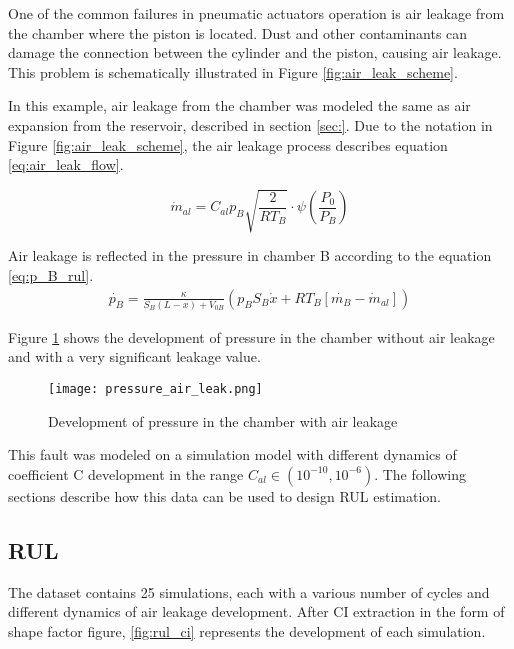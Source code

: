 One of the common failures in pneumatic actuators operation is air leakage
from the chamber where the piston is located. Dust and other contaminants
can damage the connection between the cylinder and the piston, causing air
leakage. This problem is schematically illustrated in Figure
\ref{fig:air_leak_scheme}.


In this example, air leakage from the chamber was modeled the same as air
expansion from the reservoir, described in section \ref{sec:}.  Due to the
notation in Figure \ref{fig:air_leak_scheme}, the air leakage process
describes equation \ref{eq:air_leak_flow}.

\begin{equation}
    \dot{m}_{al} = C_{al} p_B \sqrt{\frac{2}{R T_B}} \cdot
    \psi\left( \frac{P_0}{P_B} \right)
    \label{eq:air_leak_flow}
\end{equation}

Air leakage is reflected in the pressure in chamber B according to the
equation \ref{eq:p_B_rul}.
\begin{align}
    \dot{p_B} = \frac{\kappa}{S_B (L-x) + V_{0B}} \left(p_B S_B\dot{x} +
    RT_B[\dot{m_B}-\dot{m}_{al}] \right)
    \label{eq:p_B_rul}
\end{align}

Figure \ref{fig:pressure_air_leak} shows the development of pressure in the
chamber without air leakage and with a very significant leakage value.

\begin{figure}[h!]
    \centering
    \texttt{[image: pressure\_air\_leak.png]}
    \caption{Development of pressure in the chamber with air leakage}
    \label{fig:pressure_air_leak}
\end{figure}

This fault was modeled on a simulation model with different dynamics of
coefficient C development in the range $C_{al} \in (10^{-10}, 10^{-6})$. The following sections describe how
this data can be used to design RUL estimation.


\subsection{RUL}

The dataset contains 25 simulations, each with a various number of cycles
and different dynamics of air leakage development. After CI extraction in
the form of shape factor figure, \ref{fig:rul_ci} represents the
development of each simulation.

